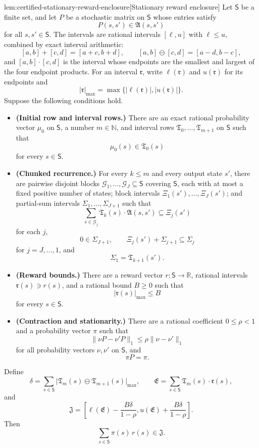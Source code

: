 \documentclass[11pt]{article}
\begin{document}
\begin{lemmav}{lem:certified-stationary-reward-enclosure}[Stationary reward enclosure]
Let \(\mathsf S\) be a finite set, and let \(P\) be a stochastic matrix on \(\mathsf S\) whose entries satisfy
\[
P(s,s')\in\mathfrak A(s,s')
\]
for all \(s,s'\in\mathsf S\). The intervals are rational intervals \([\ell,u]\) with \(\ell\le u\), combined by exact interval arithmetic:
\[
[a,b]+[c,d]=[a+c,b+d],\qquad
[a,b]\ominus[c,d]=[a-d,b-c],
\]
and \([a,b]\cdot[c,d]\) is the interval whose endpoints are the smallest and largest of the four endpoint products. For an interval \(\mathfrak r\), write \(\ell(\mathfrak r)\) and \(u(\mathfrak r)\) for its endpoints and
\[
|\mathfrak r|_{\max}=\max\{|\ell(\mathfrak r)|,|u(\mathfrak r)|\}.
\]
Suppose the following conditions hold.
\begin{itemize}
\item \textbf{(Initial row and interval rows.)} There are an exact rational probability vector \(\mu_0\) on \(\mathsf S\), a number \(m\in\mathbb N\), and interval rows \(\mathfrak T_0,\ldots,\mathfrak T_{m+1}\) on \(\mathsf S\) such that
\[
\mu_0(s)\in\mathfrak T_0(s)
\]
for every \(s\in\mathsf S\).

\item \textbf{(Chunked recurrence.)} For every \(k\le m\) and every output state \(s'\), there are pairwise disjoint blocks \(\mathcal G_1,\ldots,\mathcal G_J\subseteq\mathsf S\) covering \(\mathsf S\), each with at most a fixed positive number of states; block intervals \(\Xi_1(s'),\ldots,\Xi_J(s')\); and partial-sum intervals \(\Sigma_1,\ldots,\Sigma_{J+1}\) such that
\[
\sum_{s\in\mathcal G_j}\mathfrak T_k(s)\cdot\mathfrak A(s,s')\subseteq\Xi_j(s')
\]
for each \(j\),
\[
0\in\Sigma_{J+1},\qquad
\Xi_j(s')+\Sigma_{j+1}\subseteq\Sigma_j
\]
for \(j=J,\ldots,1\), and
\[
\Sigma_1=\mathfrak T_{k+1}(s').
\]

\item \textbf{(Reward bounds.)} There are a reward vector \(r:\mathsf S\to\mathbb R\), rational intervals \(\mathfrak r(s)\ni r(s)\), and a rational bound \(B\ge0\) such that
\[
|\mathfrak r(s)|_{\max}\le B
\]
for every \(s\in\mathsf S\).

\item \textbf{(Contraction and stationarity.)} There are a rational coefficient \(0\le\rho<1\) and a probability vector \(\pi\) such that
\[
\|\nu P-\nu'P\|_1\le\rho\|\nu-\nu'\|_1
\]
for all probability vectors \(\nu,\nu'\) on \(\mathsf S\), and
\[
\pi P=\pi .
\]
\end{itemize}
Define
\[
\delta=\sum_{s\in\mathsf S}\bigl|\mathfrak T_m(s)\ominus\mathfrak T_{m+1}(s)\bigr|_{\max},
\qquad
\mathfrak E=\sum_{s\in\mathsf S}\mathfrak T_m(s)\cdot\mathfrak r(s),
\]
and
\[
\mathfrak J=
\left[
\ell(\mathfrak E)-\frac{B\delta}{1-\rho},
u(\mathfrak E)+\frac{B\delta}{1-\rho}
\right].
\]
Then
\[
\sum_{s\in\mathsf S}\pi(s)\,r(s)\in\mathfrak J .
\]
\end{lemmav}
\end{document}
